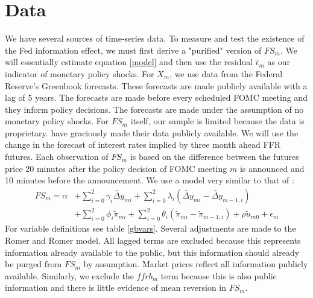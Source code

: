\documentclass[a4paper,man,floatsintext,natbib]{apa6}
\begin{document}
	\section{Data}
	We have several sources of time-series data. To measure and test the existence of the Fed information effect, we must first derive a "purified" version of \(FS_m\). We will essentially estimate equation \ref{model} and then use the residual \(\hat{\epsilon}_m\) as our indicator of monetary policy shocks. For \(X_m\), we use data from the Federal Reserve's Greenbook forecasts. These forecasts are made publicly available with a lag of 5 years. The forecasts are made before every scheduled FOMC meeting and they inform policy decisions. The forecasts are made under the assumption of no monetary policy shocks. For \(FS_m\) itself, our sample is limited because the data is proprietary. \cite{Gertler2015} have graciously made their data publicly available. We will use the change in the forecast of interest rates implied by three month ahead FFR futures. Each observation of \(FS_m\) is based on the difference between the futures price 20 minutes after the policy decision of FOMC meeting \(m\) is announced and 10 minutes before the announcement. We use a model very similar to that of \cite{Romer2004}:
	\begin{align*}
		FS_m =  \alpha &+ \sum_{i=0}^{2} \gamma_i \widetilde{\Delta y}_{mi} + \sum^2_{i=0} \lambda_i \left(\widetilde{\Delta y}_{mi}-\widetilde{\Delta y}_{m-1,i}\right) \tag{5} \label{ep_hat_model} \\
		&+\sum^{2}_{i=0} \phi_i \tilde{\pi}_{mi} + \sum^2_{i=0} \theta_i \left(\tilde{ \pi}_{mi}-\tilde{ \pi}_{m-1,i}\right) + \rho \tilde{u}_{m0} + \epsilon_m
	\end{align*}
	For variable definitions see table \ref{gbvars}. Several adjustments are made to the Romer and Romer model. All lagged terms are excluded because this represents information already available to the public, but this information should already be purged from \(FS_m\) by assumption. Market prices reflect all information publicly available. Similarly, we exclude the \(ffrb_m\) term because this is also public information and there is little evidence of mean reversion in \(FS_m\). 
\end{document}

